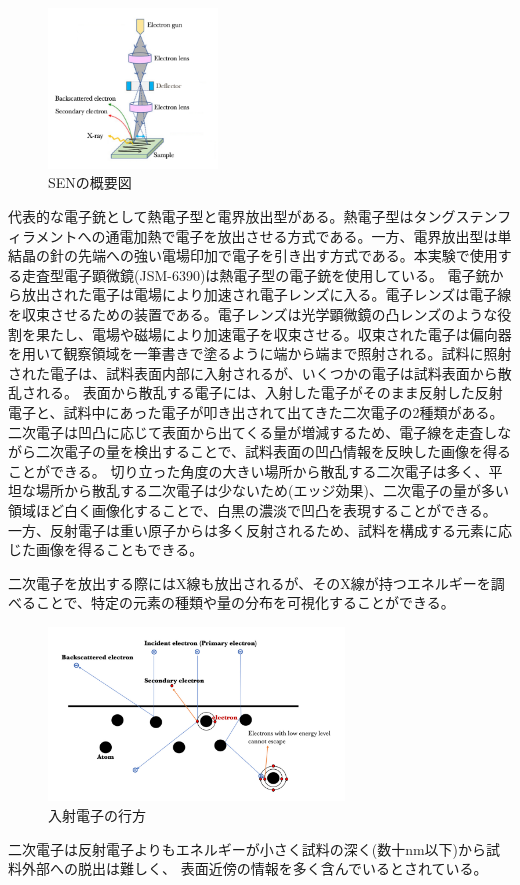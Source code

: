 \documentclass[a4paper,11pt]{jsarticle}
\begin{document}
\begin{figure}
  \centering
  \includegraphics[width=0.4\textwidth]{figs/sen.pdf}
  \caption{SENの概要図}
  \label{fig:arc}
\end{figure}
代表的な電子銃として熱電子型と電界放出型がある。熱電子型はタングステンフィラメントへの通電加熱で電子を放出させる方式である。一方、電界放出型は単結晶の針の先端への強い電場印加で電子を引き出す方式である。本実験で使用する走査型電子顕微鏡(JSM-6390)は熱電子型の電子銃を使用している。
電子銃から放出された電子は電場により加速され電子レンズに入る。電子レンズは電子線を収束させるための装置である。電子レンズは光学顕微鏡の凸レンズのような役割を果たし、電場や磁場により加速電子を収束させる。収束された電子は偏向器を用いて観察領域を一筆書きで塗るように端から端まで照射される。試料に照射された電子は、試料表面内部に入射されるが、いくつかの電子は試料表面から散乱される。
表面から散乱する電子には、入射した電子がそのまま反射した反射電子と、試料中にあった電子が叩き出されて出てきた二次電子の2種類がある。
二次電子は凹凸に応じて表面から出てくる量が増減するため、電子線を走査しながら二次電子の量を検出することで、試料表面の凹凸情報を反映した画像を得ることができる。
切り立った角度の大きい場所から散乱する二次電子は多く、平坦な場所から散乱する二次電子は少ないため(エッジ効果)、二次電子の量が多い領域ほど白く画像化することで、白黒の濃淡で凹凸を表現することができる。
一方、反射電子は重い原子からは多く反射されるため、試料を構成する元素に応じた画像を得ることもできる。

二次電子を放出する際にはX線も放出されるが、そのX線が持つエネルギーを調べることで、特定の元素の種類や量の分布を可視化することができる。

\begin{figure}[H]
  \centering
  \includegraphics[width=0.7\textwidth]{figs/electron.pdf}
  \caption{入射電子の行方}
\end{figure}
二次電子は反射電子よりもエネルギーが小さく試料の深く(数十nm以下)から試料外部への脱出は難しく、
表面近傍の情報を多く含んでいるとされている。
\end{document}
